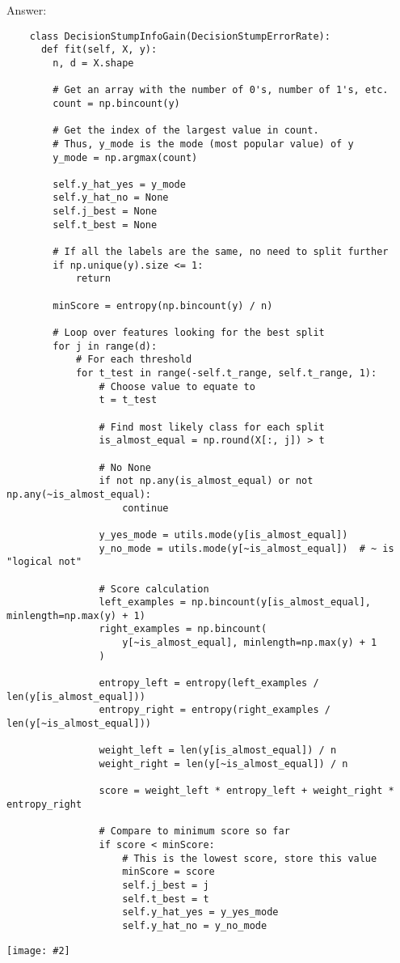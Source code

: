 \documentclass{article}
\newenvironment{answer}{\par\begingroup\color{gre}Answer: }{\endgroup}
\newcommand{\centerfig}[2]{\begin{center}\texttt{[image: \#2]}\end{center}}
\begin{document}
  \begin{answer}
  \begin{verbatim}
    class DecisionStumpInfoGain(DecisionStumpErrorRate):
      def fit(self, X, y):
        n, d = X.shape

        # Get an array with the number of 0's, number of 1's, etc.
        count = np.bincount(y)

        # Get the index of the largest value in count.
        # Thus, y_mode is the mode (most popular value) of y
        y_mode = np.argmax(count)

        self.y_hat_yes = y_mode
        self.y_hat_no = None
        self.j_best = None
        self.t_best = None

        # If all the labels are the same, no need to split further
        if np.unique(y).size <= 1:
            return

        minScore = entropy(np.bincount(y) / n)

        # Loop over features looking for the best split
        for j in range(d):
            # For each threshold
            for t_test in range(-self.t_range, self.t_range, 1):
                # Choose value to equate to
                t = t_test

                # Find most likely class for each split
                is_almost_equal = np.round(X[:, j]) > t

                # No None
                if not np.any(is_almost_equal) or not np.any(~is_almost_equal):
                    continue

                y_yes_mode = utils.mode(y[is_almost_equal])
                y_no_mode = utils.mode(y[~is_almost_equal])  # ~ is "logical not"

                # Score calculation
                left_examples = np.bincount(y[is_almost_equal], minlength=np.max(y) + 1)
                right_examples = np.bincount(
                    y[~is_almost_equal], minlength=np.max(y) + 1
                )

                entropy_left = entropy(left_examples / len(y[is_almost_equal]))
                entropy_right = entropy(right_examples / len(y[~is_almost_equal]))

                weight_left = len(y[is_almost_equal]) / n
                weight_right = len(y[~is_almost_equal]) / n

                score = weight_left * entropy_left + weight_right * entropy_right

                # Compare to minimum score so far
                if score < minScore:
                    # This is the lowest score, store this value
                    minScore = score
                    self.j_best = j
                    self.t_best = t
                    self.y_hat_yes = y_yes_mode
                    self.y_hat_no = y_no_mode
  \end{verbatim}
  \centerfig{0.7}{./figs/DecisionStumpInfoGain_decisionBoundary}
  \end{answer}
\end{document}
